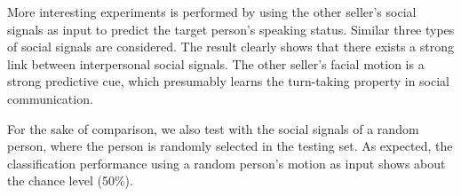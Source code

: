 More interesting experiments is performed by using the other seller's social signals as input to predict the target person's speaking status. Similar three types of social signals are considered. The result clearly shows that there exists a strong link between interpersonal social signals. The other seller's facial motion is a strong predictive cue, which presumably learns the turn-taking property in social communication.%

For the sake of comparison, we also test with the social signals of a random person, where the person is randomly selected in the testing set. As expected, the classification performance using a random person's motion as input shows about the chance level (50\%). 



